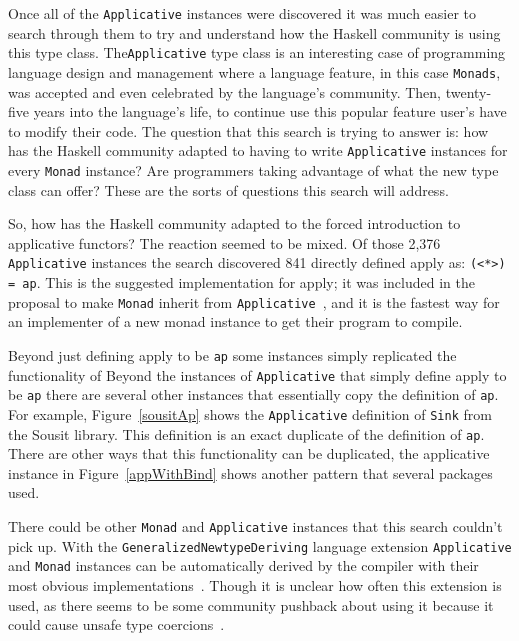 Once all of the \texttt{Applicative} instances were discovered it was much easier to search through them to try and understand how the Haskell community is using this type class. The\texttt{Applicative} type class is an interesting case of programming language design and management where a language feature, in this case \texttt{Monads}, was accepted and even celebrated by the language's community. Then, twenty-five years into the language's life, to continue use this popular feature user's have to modify their code. The question that this search is trying to answer is: how has the Haskell community adapted to having to write \texttt{Applicative} instances for every \texttt{Monad} instance? Are programmers taking advantage of what the new type class can offer? These are the sorts of questions this search will address.   

So, how has the Haskell community adapted to the forced introduction to applicative functors? The reaction seemed to be mixed. Of those 2,376 \texttt{Applicative} instances the search discovered 841 directly defined apply as: \texttt{(<*>) = ap}. This is the suggested implementation for apply; it was included in the proposal to make \texttt{Monad} inherit from \texttt{Applicative}~\citep{applicativeProposal}, and it is the fastest way for an implementer of a new monad instance to get their program to compile. 

Beyond just defining apply to be \texttt{ap} some instances simply replicated the functionality of 
Beyond the instances of \texttt{Applicative} that simply define apply to be \texttt{ap} there are several other instances that essentially copy the definition of \texttt{ap}. For example, Figure~\ref{sousitAp} shows the \texttt{Applicative} definition of \texttt{Sink} from the Sousit library. This definition is an exact duplicate of the definition of \texttt{ap}. There are other ways that this functionality can be duplicated, the applicative instance in Figure~\ref{appWithBind} shows another pattern that several packages used. 

There could be other \texttt{Monad} and \texttt{Applicative} instances that this search couldn't pick up. With the \texttt{GeneralizedNewtypeDeriving} language extension \texttt{Applicative} and \texttt{Monad} instances can be automatically derived by the compiler with their most obvious implementations~\citep{genDeriveBlog}. Though it is unclear how often this extension is used, as there seems to be some community pushback about using it because it could cause unsafe type coercions~\citep{genDeriveUnsafe}. 

